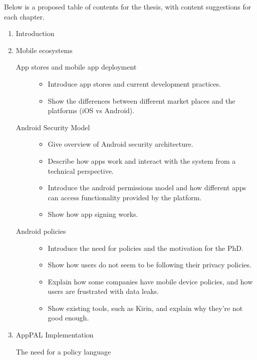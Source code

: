 \documentclass[a4paper]{scrartcl}
\begin{document}
Below is a proposed table of contents for the thesis, with content suggestions for each chapter.

\begin{enumerate}
  \item Introduction
  \item Mobile ecosystems
    \begin{description}
      \item[App stores and mobile app deployment]
        \hfill
        \begin{itemize}
          \item Introduce app stores and current development practices.
          \item Show the differences between different market places and the platforms (iOS vs Android).
        \end{itemize}
      \item[Android Security Model]
        \hfill
        \begin{itemize}
          \item Give overview of Android security architecture.
          \item Describe how apps work and interact with the system from a technical perspective.
          \item Introduce the android permissions model and how different apps can access functionality provided by the platform.
          \item Show how app signing works.
        \end{itemize}
      \item[Android policies]
        \hfill
        \begin{itemize}
          \item Introduce the need for policies and the motivation for the PhD.
          \item Show how users do not seem to be following their privacy policies.
          \item Explain how some companies have mobile device policies, and how users are frustrated with data leaks.
          \item Show existing tools, such as Kirin, and explain why they're not good enough.
        \end{itemize}
    \end{description}
  \item AppPAL Implementation
    \begin{description}
      \item[The need for a policy language]

\end{description}
\end{enumerate}
\end{document}
